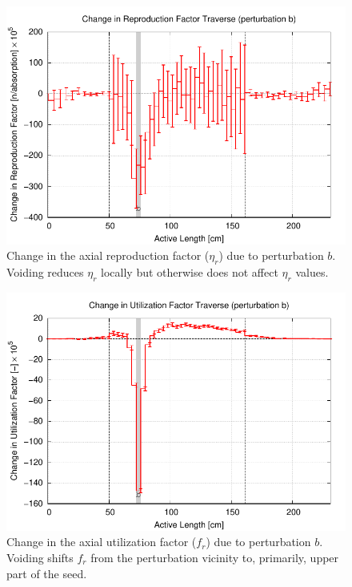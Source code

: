 \documentclass[11pt]{article}
\begin{document}
\clearpage
\begin{figure}[p]
  \centering
  \includegraphics[width=\textwidth, trim=0 0 0 0.275in, clip]{./img/Th-b-TraverseDeltaEta.pdf}
  \caption{Change in the axial reproduction factor ($\eta_r$) due to perturbation $b$. Voiding reduces $\eta_r$ locally but otherwise does not affect $\eta_r$ values.}
  \label{fig:deltaEtaR}
\end{figure}

\clearpage
\begin{figure}[p]
  \centering
  \includegraphics[width=\textwidth, trim=0 0 0 0.275in, clip]{./img/Th-b-TraverseDeltaEff.pdf}
  \caption{Change in the axial utilization factor ($f_r$) due to perturbation $b$. Voiding shifts $f_r$ from the perturbation vicinity to, primarily, upper part of the seed.}
  \label{fig:deltaEffR}
\end{figure}
\end{document}
